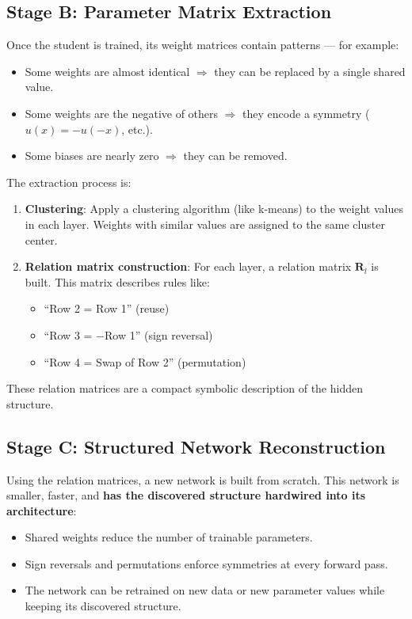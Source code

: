 \documentclass[11pt,a4paper]{article}
\begin{document}
\subsection{Stage B: Parameter Matrix Extraction}

Once the student is trained, its weight matrices contain patterns --- for example:
\begin{itemize}[nosep]
    \item Some weights are almost identical $\Rightarrow$ they can be replaced by a single shared value.
    \item Some weights are the negative of others $\Rightarrow$ they encode a symmetry ($u(x) = -u(-x)$, etc.).
    \item Some biases are nearly zero $\Rightarrow$ they can be removed.
\end{itemize}

The extraction process is:
\begin{enumerate}[nosep]
    \item \textbf{Clustering}: Apply a clustering algorithm (like k-means) to the weight values in each layer. Weights with similar values are assigned to the same cluster center.
    \item \textbf{Relation matrix construction}: For each layer, a relation matrix $\mathbf{R}_l$ is built. This matrix describes rules like:
    \begin{itemize}[nosep]
        \item ``Row 2 = Row 1'' (reuse)
        \item ``Row 3 = $-$Row 1'' (sign reversal)
        \item ``Row 4 = Swap of Row 2'' (permutation)
    \end{itemize}
\end{enumerate}

These relation matrices are a compact symbolic description of the hidden structure.

\subsection{Stage C: Structured Network Reconstruction}

Using the relation matrices, a new network is built from scratch. This network is smaller, faster, and \textbf{has the discovered structure hardwired into its architecture}:

\begin{itemize}[nosep]
    \item Shared weights reduce the number of trainable parameters.
    \item Sign reversals and permutations enforce symmetries at every forward pass.
    \item The network can be retrained on new data or new parameter values while keeping its discovered structure.
\end{itemize}
\end{document}
